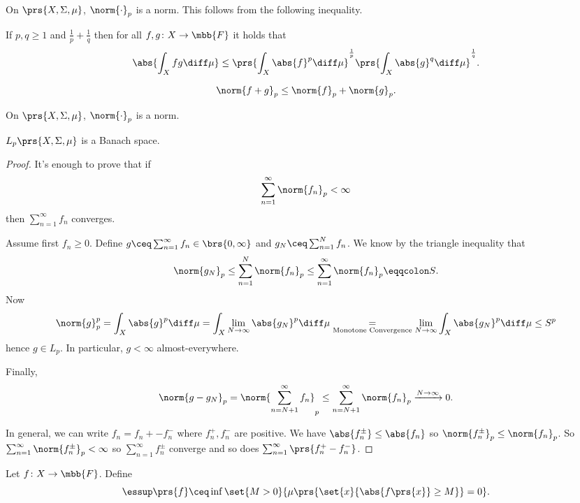 \documentclass[10pt, twoside]{book}
\begin{document}
On $\prs{X, \Sigma, \mu}$, $\norm{\cdot}_p$ is a norm. This follows from the following inequality.

\begin{theorem}
If $p,q \geq 1$ and $\frac{1}{p} + \frac{1}{q}$ then for all $f,g \colon X \to \mbb{F}$ it holds that
\[\abs{\int_X fg \diff \mu} \leq \prs{\int_X \abs{f}^p \diff \mu}^{\frac{1}{p}} \prs{\int_X \abs{g}^q \diff \mu}^{\frac{1}{q}} \text{.}\]
\end{theorem}

\begin{corollary}
\[\norm{f+g}_p \leq \norm{f}_p + \norm{g}_p \text{.}\]
\end{corollary}

\begin{corollary}
On $\prs{X, \Sigma, \mu}$, $\norm{\cdot}_p$ is a norm.
\end{corollary}

\begin{theorem}
$L_p\prs{X, \Sigma, \mu}$ is a Banach space.
\end{theorem}

\begin{proof}
It's enough to prove that if
\[\sum_{n=1}^{\infty} \norm{f_n}_p < \infty\]
then
$\sum_{n=1}^{\infty} f_n$ converges.

Assume first $f_n \geq 0$. Define $g \ceq \sum_{n=1}^{\infty} f_n \in \brs{0,\infty}$ and $g_N \ceq \sum_{n=1}^N f_n$.
We know by the triangle inequality that
\[\norm{g_N}_p \leq \sum_{n=1}^N \norm{f_n}_p \leq \sum_{n=1}^{\infty} \norm{f_n}_p \eqqcolon S \text{.}\]
Now
\[\norm{g}_p^p = \int_X \abs{g}^p \diff \mu = \int_X \lim_{N \to \infty} \abs{g_N}^p \diff \mu \underset{\text{Monotone Convergence}}{=} \lim_{N \to \infty} \int_X \abs{g_N}^p \diff \mu \leq S^p\]
hence $g \in L_p$.
In particular, $g < \infty$ almost-everywhere.

Finally,
\[\norm{g - g_N}_p = \norm{\sum_{n = N+1}^\infty f_n}_p \leq \sum_{n = N + 1}^\infty \norm{f_n}_p \xrightarrow{N \to \infty} 0 \text{.}\]

In general, we can write $f_n = f_n+ - f_n^{-}$ where $f_n^+, f_n^-$ are positive. We have $\abs{f_n^\pm} \leq \abs{f_n}$ so $\norm{f_n^\pm}_p \leq \norm{f_n}_p$.
So $\sum_{n=1}^{\infty} \norm{f_n^\pm}_p < \infty$ so $\sum_{n=1}^{\infty} f_n^\pm$ converge and so does $\sum_{n=1}^{\infty} \prs{f_n^+ - f_n^{-}}$.
\end{proof}

\begin{definition}
Let $f \colon X \to \mbb{F}$.
Define
\[\essup\prs{f} \ceq \inf \set{M > 0}{\mu\prs{\set{x}{\abs{f\prs{x}} \geq M}} = 0} \text{.}\]
\end{definition}
\end{document}
